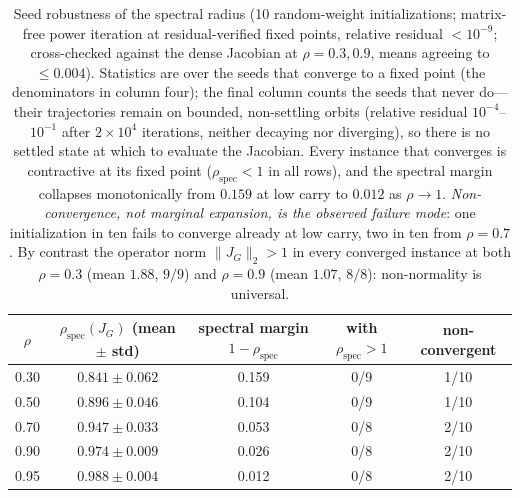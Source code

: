 \documentclass[11pt]{article}
\begin{document}
\begin{table}[ht]
\centering
\begin{tabular}{@{}ccccc@{}}
\toprule
$\rho$ & $\rho_{\text{spec}}(J_G)$ (mean $\pm$ std) & spectral margin $1-\rho_{\text{spec}}$ & with $\rho_{\text{spec}} > 1$ & non-convergent \\
\midrule
0.30 & $0.841 \pm 0.062$ & 0.159 & 0/9 & 1/10 \\
0.50 & $0.896 \pm 0.046$ & 0.104 & 0/9 & 1/10 \\
0.70 & $0.947 \pm 0.033$ & 0.053 & 0/8 & 2/10 \\
0.90 & $0.974 \pm 0.009$ & 0.026 & 0/8 & 2/10 \\
0.95 & $0.988 \pm 0.004$ & 0.012 & 0/8 & 2/10 \\
\bottomrule
\end{tabular}
\caption{Seed robustness of the spectral radius (10 random-weight initializations; matrix-free power iteration at residual-verified fixed points, relative residual $< 10^{-9}$; cross-checked against the dense Jacobian at $\rho = 0.3, 0.9$, means agreeing to $\le 0.004$). Statistics are over the seeds that converge to a fixed point (the denominators in column four); the final column counts the seeds that never do---their trajectories remain on bounded, non-settling orbits (relative residual $10^{-4}$--$10^{-1}$ after $2 \times 10^4$ iterations, neither decaying nor diverging), so there is no settled state at which to evaluate the Jacobian. Every instance that converges is contractive at its fixed point ($\rho_{\text{spec}} < 1$ in all rows), and the spectral margin collapses monotonically from $0.159$ at low carry to $0.012$ as $\rho \to 1$. \emph{Non-convergence, not marginal expansion, is the observed failure mode}: one initialization in ten fails to converge already at low carry, two in ten from $\rho = 0.7$. By contrast the operator norm $\|J_G\|_2 > 1$ in every converged instance at both $\rho = 0.3$ (mean $1.88$, $9/9$) and $\rho = 0.9$ (mean $1.07$, $8/8$): non-normality is universal.}
\label{tab:seed-robustness}
\end{table}
\end{document}

